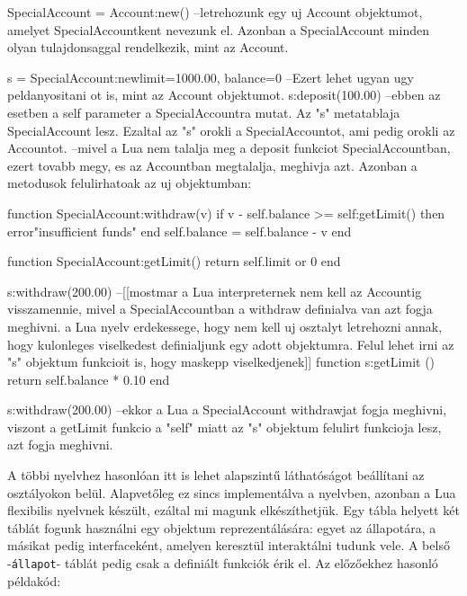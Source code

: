 \begin{lua}
SpecialAccount = Account:new() --letrehozunk egy uj Account objektumot, amelyet SpecialAccountkent nevezunk el. Azonban a SpecialAccount minden olyan tulajdonsaggal rendelkezik, mint az Account.

s = SpecialAccount:new{limit=1000.00, balance=0} --Ezert lehet ugyan ugy peldanyositani ot is, mint az Account objektumot.
s:deposit(100.00) --ebben az esetben a self parameter a SpecialAccountra mutat. Az "s" metatablaja SpecialAccount lesz. Ezaltal az "s" orokli a SpecialAccountot, ami pedig orokli az Accountot.
--mivel a Lua nem talalja meg a deposit funkciot SpecialAccountban, ezert tovabb megy, es az Accountban megtalalja, meghivja azt. Azonban a metodusok felulirhatoak az uj objektumban:

function SpecialAccount:withdraw(v)
	if v - self.balance >= self:getLimit() then
		error"insufficient funds"
	end
	self.balance = self.balance - v
end

function SpecialAccount:getLimit()
	return self.limit or 0
end

s:withdraw(200.00) --[[mostmar a Lua interpreternek nem kell az Accountig visszamennie, mivel a SpecialAccountban a withdraw definialva van azt fogja meghivni. 
a Lua nyelv erdekessege, hogy nem kell uj osztalyt letrehozni annak, hogy kulonleges viselkedest definialjunk egy adott objektumra. Felul lehet irni az "s" objektum funkcioit is, hogy maskepp viselkedjenek]]
function s:getLimit ()
  return self.balance * 0.10
end

s:withdraw(200.00) --ekkor a Lua a SpecialAccount withdrawjat fogja meghivni, viszont a getLimit funkcio a "self" miatt az "s" objektum felulirt funkcioja lesz, azt fogja meghivni.
\end{lua}
\pagebreak
{}
A többi nyelvhez hasonlóan itt is lehet alapszintű láthatóságot beállítani az osztályokon belül. Alapvetőleg ez sincs implementálva a nyelvben, azonban a Lua flexibilis nyelvnek készült, ezáltal mi magunk elkészíthetjük. Egy tábla helyett két táblát fogunk használni egy objektum reprezentálására:
egyet az állapotára, a másikat pedig interfaceként, amelyen keresztül interaktálni tudunk vele. A belső -\texttt{állapot}- táblát pedig csak a definiált funkciók érik el. Az előzőekhez hasonló példakód:

